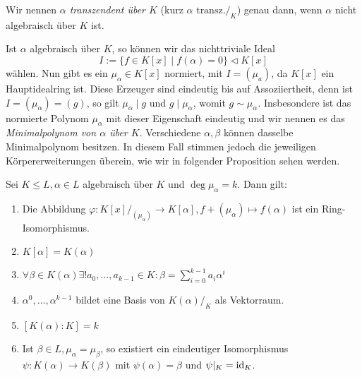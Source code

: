 \begin{definition}
    Wir nennen \emph{$\alpha$ transzendent über $K$} (kurz $\alpha \text { transz.}/_K$) genau dann, wenn $\alpha$ nicht algebraisch über $K$ ist.
\end{definition}

\begin{remark}
    Ist $\alpha$ algebraisch über $K$, so können wir das nichttriviale Ideal
    $$ I := \{ f \in K[x] \mid f(\alpha) = 0 \} \vartriangleleft K[x] $$
    wählen. Nun gibt es ein $\mu_\alpha \in K[x]$ normiert, mit $I = (\mu_a)$, da $K[x]$ ein Hauptidealring ist. Diese Erzeuger sind eindeutig bis auf Assoziiertheit, denn ist $I = (\mu_\alpha) = (g)$, so gilt $\mu_\alpha \mid g$ und $g \mid \mu_\alpha$, womit $g \sim \mu_\alpha$. Insbesondere ist das normierte Polynom $\mu_\alpha$ mit dieser Eigenschaft eindeutig und wir nennen es das \emph{Minimalpolynom von $\alpha$ über $K$}. Verschiedene $\alpha, \beta$ können dasselbe Minimalpolynom besitzen. In diesem Fall stimmen jedoch die jeweiligen Körpererweiterungen überein, wie wir in folgender Proposition sehen werden.
\end{remark}

\begin{proposition}
    Sei $K \leq L, \alpha \in L$ algebraisch über $K$ und $\deg \mu_\alpha = k$. Dann gilt:
    \begin{enumerate}
        \item Die Abbildung $\varphi : K[x]/_{(\mu_\alpha)} \to K[\alpha], f + (\mu_\alpha) \mapsto f(\alpha)$ ist ein Ring-Isomorphismus.
        \item $K[\alpha] = K(\alpha)$
        \item $\forall \beta \in K(\alpha) \exists ! a_0, \hdots, a_{k-1} \in K: \beta = \sum_{i=0}^{k-1}a_i \alpha^i$
        \item $\alpha^0, \hdots, \alpha^{k-1}$ bildet eine Basis von $K(\alpha)/_K$ als Vektorraum.
        \item $[K(\alpha) : K] = k$
        \item Ist $\beta \in L, \mu_\alpha = \mu_\beta$, so existiert ein eindeutiger Isomorphismus $\psi : K(\alpha) \to K(\beta)$ mit $\psi(\alpha) = \beta$ und $\psi\vert_K = \operatorname{id}_K$.
    \end{enumerate}
\end{proposition}

